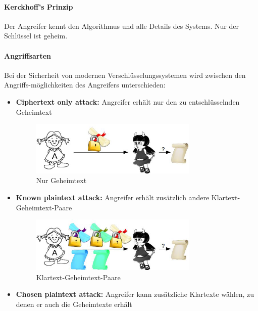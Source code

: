 \documentclass[10pt,a4paper]{article}
\begin{document}
\paragraph*{Kerckhoff's Prinzip}\label{para:Kerckhoff's Prinzip}Der Angreifer kennt den Algorithmus und alle Details des Systems. Nur der Schlüssel ist geheim.

\paragraph*{Angriffsarten}Bei der Sicherheit von modernen Verschlüsselungssystemen wird zwischen den Angriffs-möglichkeiten des Angreifers unterschieden:
\begin{itemize}[noitemsep,topsep=0pt,leftmargin=*]
    \item \textbf{Ciphertext only attack:} Angreifer erhält nur den zu entschlüsselnden Geheimtext
    \begin{figure}[ht]
        \begin{center}
        \includegraphics[width=8cm]{images/coa.png}
        \caption{Nur Geheimtext}
        \label{coa}
        \end{center}
    \end{figure}
    \item \textbf{Known plaintext attack:} Angreifer erhält zusätzlich andere Klartext-Geheimtext-Paare
    \begin{figure}[ht]
        \begin{center}
        \includegraphics[width=8cm]{images/kpa.png}
        \caption{Klartext-Geheimtext-Paare}
        \label{kpa}
        \end{center}
    \end{figure}
    \item \textbf{Chosen plaintext attack:} Angreifer kann zusätzliche Klartexte wählen, zu denen er auch die Geheimtexte erhält

\end{itemize}
\end{document}
